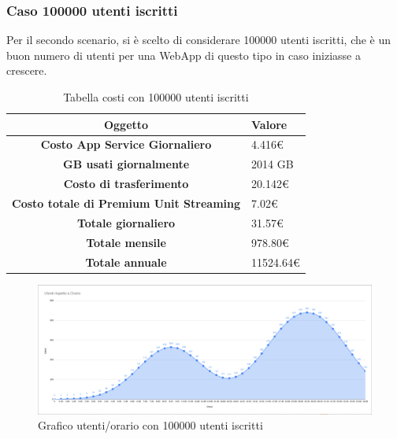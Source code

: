 \subsubsection{Caso 100000 utenti iscritti}
Per il secondo scenario, si è scelto di considerare 100000 utenti iscritti, che è un buon numero di utenti per una WebApp di questo tipo in caso iniziasse a crescere.\\
\begin{table}[H]
    \label{tab:costi-100000}
    \begin{tabularx}{\textwidth}{|c|X|}
        \hline
        \textbf{Oggetto} & \textbf{Valore} \\\hline
        
        \textbf{Costo App Service Giornaliero} & {4.416€} \\ 
        \hline
        \textbf{GB usati giornalmente} & {2014 GB} \\ 
        \hline
        \textbf{Costo di trasferimento} & {20.142€}\\
        \hline
        \textbf{Costo totale di Premium Unit Streaming} & {7.02€}\\  
        \hline
        \textbf{Totale giornaliero} & {31.57€}\\  
        \hline
        \textbf{Totale mensile} & {978.80€}\\  
        \hline
        \textbf{Totale annuale} & {11524.64€}\\  
        \hline
    \end{tabularx}
    \caption{Tabella costi con 100000 utenti iscritti}
\end{table}
\begin{figure}[H]
    \centering
    \includegraphics[scale=0.25]{images/costi/100kuser.png}
    \caption{Grafico utenti/orario con 100000 utenti iscritti}
    \label{fig:costi-100000}
\end{figure}

